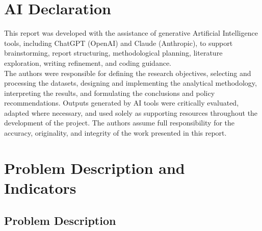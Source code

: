 \section*{AI Declaration}

This report was developed with the assistance of generative Artificial Intelligence tools, including ChatGPT (OpenAI) and Claude (Anthropic), to support brainstorming, report structuring, methodological planning, literature exploration, writing refinement, and coding guidance.\\

The authors were responsible for defining the research objectives, selecting and processing the datasets, designing and implementing the analytical methodology, interpreting the results, and formulating the conclusions and policy recommendations. Outputs generated by AI tools were critically evaluated, adapted where necessary, and used solely as supporting resources throughout the development of the project. The authors assume full responsibility for the accuracy, originality, and integrity of the work presented in this report.\\

\newpage




\tableofcontents
\newpage




\section{Problem Description and Indicators}





\subsection{Problem Description}



